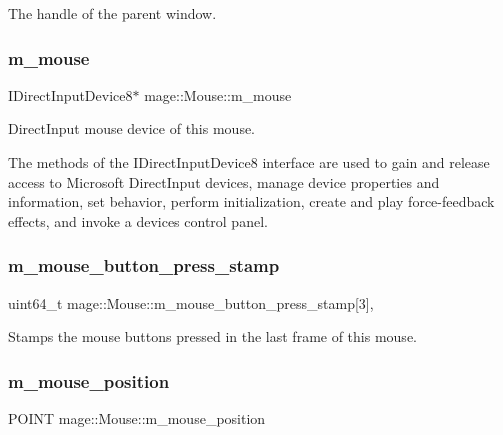 The handle of the parent window. \hypertarget{classmage_1_1_mouse_a873713cdf019671a94952d88faeb2b7a}{}\label{classmage_1_1_mouse_a873713cdf019671a94952d88faeb2b7a} 
\subsubsection{\texorpdfstring{m\+\_\+mouse}{m\_mouse}}
{\footnotesize\ttfamily I\+Direct\+Input\+Device8$\ast$ mage\+::\+Mouse\+::m\+\_\+mouse\hspace{0.3cm}{\ttfamily [protected]}}

Direct\+Input mouse device of this mouse.

The methods of the I\+Direct\+Input\+Device8 interface are used to gain and release access to Microsoft Direct\+Input devices, manage device properties and information, set behavior, perform initialization, create and play force-\/feedback effects, and invoke a device\textquotesingle{}s control panel. \hypertarget{classmage_1_1_mouse_a0f5a38e23bdf7eae1b7b1030a53edff0}{}\label{classmage_1_1_mouse_a0f5a38e23bdf7eae1b7b1030a53edff0} 
\subsubsection{\texorpdfstring{m\+\_\+mouse\+\_\+button\+\_\+press\+\_\+stamp}{m\_mouse\_button\_press\_stamp}}
{\footnotesize\ttfamily uint64\+\_\+t mage\+::\+Mouse\+::m\+\_\+mouse\+\_\+button\+\_\+press\+\_\+stamp\mbox{[}3\mbox{]}\hspace{0.3cm}{\ttfamily [mutable]}, {\ttfamily [protected]}}

Stamps the mouse buttons pressed in the last frame of this mouse. \hypertarget{classmage_1_1_mouse_a2a8332ef7a4daa0f9ed48a9a1ad80684}{}\label{classmage_1_1_mouse_a2a8332ef7a4daa0f9ed48a9a1ad80684} 
\subsubsection{\texorpdfstring{m\+\_\+mouse\+\_\+position}{m\_mouse\_position}}
{\footnotesize\ttfamily P\+O\+I\+NT mage\+::\+Mouse\+::m\+\_\+mouse\+\_\+position\hspace{0.3cm}{\ttfamily [protected]}}

